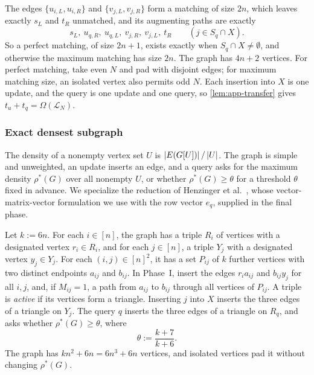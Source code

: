 The edges $\{u_{i,L},u_{i,R}\}$ and $\{v_{j,L},v_{j,R}\}$ form a matching of size $2n$, which leaves exactly $s_L$ and $t_R$ unmatched, and its augmenting paths are exactly
\[
 s_L,\ u_{q,R},\ u_{q,L},\ v_{j,R},\ v_{j,L},\ t_R
 \qquad (j\in S_q\cap X).
\]
So a perfect matching, of size $2n+1$, exists exactly when $S_q\cap X\ne\emptyset$, and otherwise the maximum matching has size $2n$. The graph has $4n+2$ vertices. For perfect matching, take even $N$ and pad with disjoint edges; for maximum matching size, an isolated vertex also permits odd $N$. Each insertion into $X$ is one update, and the query is one update and one query, so \cref{lem:app-transfer} gives $t_u+t_q=\Omega(\mathcal L_N)$.

\subsubsection{Exact densest subgraph}\label{sec:app-density}

The density of a nonempty vertex set $U$ is $\left|E(G[U])\right|/\left|U\right|$. The graph is simple and unweighted, an update inserts an edge, and a query asks for the maximum density $\rho^*(G)$ over all nonempty $U$, or whether $\rho^*(G)\ge\theta$ for a threshold $\theta$ fixed in advance. We specialize the reduction of Henzinger et al.~\cite[Section~3.6, Theorems~3.23 and~3.25]{henzinger_unifying_2015}, whose vector-matrix-vector formulation we use with the row vector $e_q$, supplied in the final phase.

Let $k:=6n$. For each $i\in[n]$, the graph has a triple $R_i$ of vertices with a designated vertex $r_i\in R_i$, and for each $j\in[n]$, a triple $Y_j$ with a designated vertex $y_j\in Y_j$. For each $(i,j)\in[n]^2$, it has a set $P_{ij}$ of $k$ further vertices with two distinct endpoints $a_{ij}$ and $b_{ij}$. In Phase~I, insert the edges $r_ia_{ij}$ and $b_{ij}y_j$ for all $i,j$, and, if $M_{ij}=1$, a path from $a_{ij}$ to $b_{ij}$ through all vertices of $P_{ij}$. A triple is \emph{active} if its vertices form a triangle. Inserting $j$ into $X$ inserts the three edges of a triangle on $Y_j$. The query $q$ inserts the three edges of a triangle on $R_q$, and asks whether $\rho^*(G)\ge\theta$, where
\[
\theta:=\frac{k+7}{k+6}.
\]
The graph has $kn^2+6n=6n^3+6n$ vertices, and isolated vertices pad it without changing $\rho^*(G)$.

